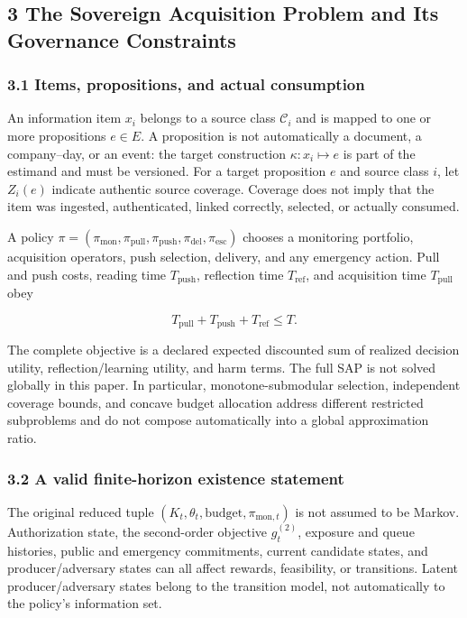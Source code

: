 \documentclass[
  11pt]{article}
\begin{document}
\subsection{3 The Sovereign Acquisition Problem and Its Governance
Constraints}\label{the-sovereign-acquisition-problem-and-its-governance-constraints}

\subsubsection{3.1 Items, propositions, and actual
consumption}\label{items-propositions-and-actual-consumption}

An information item \(x_i\) belongs to a source class \(\mathcal C_i\)
and is mapped to one or more propositions \(e\in E\). A proposition is
not automatically a document, a company--day, or an event: the target
construction \(\kappa:x_i\mapsto e\) is part of the estimand and must be
versioned. For a target proposition \(e\) and source class \(i\), let
\(Z_i(e)\) indicate authentic source coverage. Coverage does not imply
that the item was ingested, authenticated, linked correctly, selected,
or actually consumed.

A policy
\(\pi=(\pi_{\mathrm{mon}},\pi_{\mathrm{pull}},\pi_{\mathrm{push}},\pi_{\mathrm{del}},\pi_{\mathrm{esc}})\)
chooses a monitoring portfolio, acquisition operators, push selection,
delivery, and any emergency action. Pull and push costs, reading time
\(T_{\mathrm{push}}\), reflection time \(T_{\mathrm{ref}}\), and
acquisition time \(T_{\mathrm{pull}}\) obey

\[T_{\mathrm{pull}}+T_{\mathrm{push}}+T_{\mathrm{ref}}\le T.\]

The complete objective is a declared expected discounted sum of realized
decision utility, reflection/learning utility, and harm terms. The full
SAP is not solved globally in this paper. In particular,
monotone-submodular selection, independent coverage bounds, and concave
budget allocation address different restricted subproblems and do not
compose automatically into a global approximation ratio.

\subsubsection{3.2 A valid finite-horizon existence
statement}\label{a-valid-finite-horizon-existence-statement}

The original reduced tuple
\((K_t,\theta_t,\text{budget},\pi_{\mathrm{mon},t})\) is not assumed to
be Markov. Authorization state, the second-order objective
\(g_t^{(2)}\), exposure and queue histories, public and emergency
commitments, current candidate states, and producer/adversary states can
all affect rewards, feasibility, or transitions. Latent
producer/adversary states belong to the transition model, not
automatically to the policy's information set.
\end{document}
